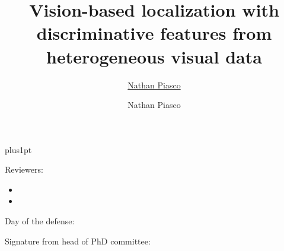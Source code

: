 \documentclass[twoside,11pt]{Latex/Classes/PhDthesisPSnPDF}
\title{Vision-based localization with discriminative features from heterogeneous visual data}
\author{\href{mailto:nathan.piasco@u-bourgogne.fr}{Nathan Piasco}}
\author{Nathan Piasco}
\begin{document}

\baselineskip=18pt plus1pt



\maketitle  %


\newpage
{\pagestyle{plain}
\vspace{10mm}
Reviewers:

\begin{itemize}
\item[] 
\item[] 
\end{itemize}

\vspace{20mm}
Day of the defense: 

\vspace{20mm}
\hspace{70mm}Signature from head of PhD committee:





%

%  






}
\end{document}
